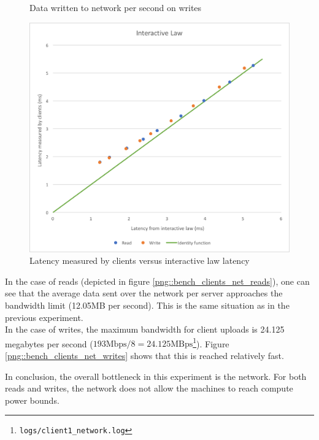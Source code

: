 \documentclass[11pt,a4paper]{article}
\begin{document}
\begin{figure}[!h]
\begin{minipage}[b]{.45\textwidth}
        \caption{Data written to network per second on writes}
        \label{png::bench_clients_net_writes}
    \end{minipage}
    \begin{minipage}[b]{.45\textwidth}
        \vspace{1cm}
        \centering
        \includegraphics[width=\textwidth]{processing/graphics/bench_clients_inter_law.png}
        \caption{Latency measured by clients versus interactive law latency}
        \label{png::bench_clients_inter_law}
    \end{minipage}
\end{figure}

In the case of reads (depicted in figure \ref{png::bench_clients_net_reads}), one can see that the average data sent over the network per server approaches the bandwidth limit (12.05MB per second). This is the same situation as in the previous experiment.\\
\indent In the case of writes, the maximum bandwidth for client uploads is 24.125 megabytes per second ($193\text{Mbps}/8=24.125\text{MBps}$\footnote{\texttt{logs/client1_network.log}}). Figure \ref{png::bench_clients_net_writes} shows that this is reached relatively fast.

In conclusion, the overall bottleneck in this experiment is the network. For both reads and writes, the network does not allow the machines to reach compute power bounds.
\end{document}
